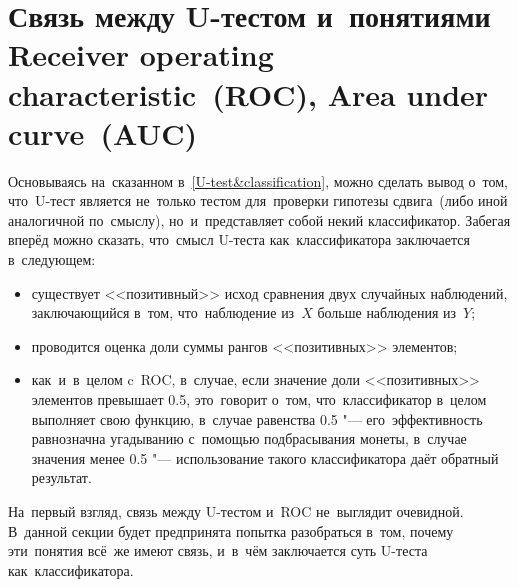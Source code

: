 \documentclass[]{scrreprt}
\begin{document}
\section{Связь между U-тестом и~понятиями \foreignlanguage{english}{Receiver operating characteristic~(ROC), Area under curve~(AUC)}}\label{U-AUC}
Основываясь на~сказанном в~\ref{U-test&classification}, можно сделать вывод о~том, что~U-тест является не~только тестом для~проверки гипотезы сдвига~(либо иной аналогичной по~смыслу), но~и~представляет собой некий классификатор. Забегая вперёд можно сказать, что~смысл U-теста как~классификатора заключается в~следующем:
\begin{itemize}
	\item существует <<позитивный>> исход сравнения двух случайных наблюдений, заключающийся в~том, что~наблюдение из~$X$ больше наблюдения из~$Y$;
	\item проводится оценка доли суммы рангов <<позитивных>> элементов;
	\item как~и~в~целом c~ROC, в~случае, если значение доли <<позитивных>> элементов превышает 0.5, это~говорит о~том, что~классификатор в~целом выполняет свою функцию, в~случае равенства 0.5 "--- его~эффективность равнозначна угадыванию с~помощью подбрасывания монеты, в~случае значения менее 0.5 "--- использование такого классификатора даёт обратный результат.	 
\end{itemize}
На~первый взгляд, связь между U-тестом и~ROC не~выглядит очевидной. В~данной секции будет предпринята попытка разобраться в~том, почему эти~понятия всё~же имеют связь, и~в~чём заключается суть U-теста как~классификатора.
\end{document}
